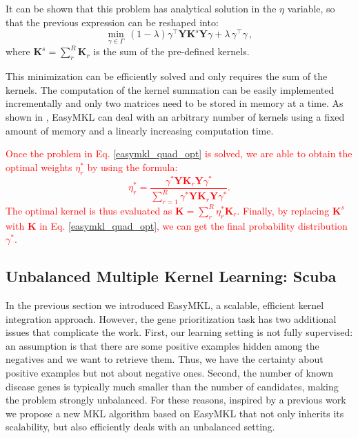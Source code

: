 It can be shown that this problem has analytical solution in the $\eta$ variable, so that the previous expression can be reshaped into: 
\begin{equation}\label{easymkl_quad_opt}
\min \limits_{\gamma \in \Gamma} \, (1 - \lambda) \gamma^{\top} \textbf{Y} \textbf{K}^{s} \textbf{Y} \gamma + \lambda \, \gamma^{\top} \gamma \, ,
\end{equation}
where $\textbf{K}^{s}=\sum_{r}^{R}\textbf{K}_r$ is the sum of the pre-defined kernels.

This minimization can be efficiently solved and only requires the sum of the kernels. The computation of the kernel summation can be easily implemented incrementally and only two matrices need to be stored in memory at a time. As shown in \cite{easymkl}, EasyMKL can deal with an arbitrary number of kernels using a fixed amount of memory and a linearly increasing computation time.

\textcolor{red}{Once the problem in Eq. \ref{easymkl_quad_opt} is solved, we are able to obtain the optimal weights $\eta_r^*$ by using the formula:
\begin{equation}\label{eta}
	\eta_r^* = \frac{\gamma^* \textbf{Y} \textbf{K}_r \textbf{Y} \gamma^*}{\sum_{r=1}^R \gamma^* \textbf{Y} \textbf{K}_r \textbf{Y} \gamma^*}.
\end{equation}
The optimal kernel is thus evaluated as $ \textbf{K} = \sum_{r}^R \eta_r^* \textbf{K}_r$. Finally, by replacing $\textbf{K}^{s}$ with $\textbf{K}$ in Eq. \ref{easymkl_quad_opt}, we can get the final probability distribution $\gamma^{*}$.}

\subsection*{Unbalanced Multiple Kernel Learning: Scuba}
In the previous section we introduced EasyMKL, a scalable, efficient kernel integration approach. However, the gene prioritization task has two additional issues that complicate the work. First, our learning setting is not fully supervised: an assumption is that there are some positive examples hidden among the negatives and we want to retrieve them. Thus, we have the certainty about positive examples but not about negative ones. Second, the number of known disease genes is typically much smaller than the number of candidates, making the problem strongly unbalanced. For these reasons, inspired by a previous work \cite{pyros} we propose a new MKL algorithm based on EasyMKL that not only inherits its scalability, but also efficiently deals with an unbalanced setting.

